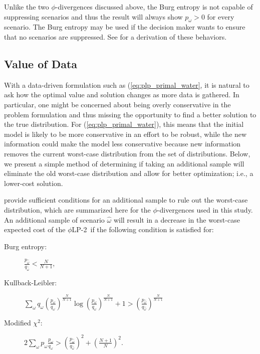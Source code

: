 \documentclass[11pt]{article}
\theoremstyle{plain}
\theoremstyle{definition}
\theoremstyle{remark}
\newcommand{\plp}{$\phi$LP-2}
\begin{document}
Unlike the two $\phi$-divergences discussed above, the Burg entropy is not capable of suppressing scenarios and thus the result will always show $p_\omega > 0$ for every scenario.
The Burg entropy may be used if the decision maker wants to ensure that no scenarios are suppressed.
See \citep{love2013phi} for a derivation of these behaviors.


\subsection{Value of Data}
\label{ssec:value_water}

With a data-driven formulation such as (\ref{eq:plp_primal_water}, it is natural to ask how the optimal value and solution changes as more data is gathered.
In particular, one might be concerned about being overly conservative in the problem formulation and thus missing the opportunity to find a better solution to the true distribution.
For (\ref{eq:plp_primal_water}), this means that the initial model is likely to be more conservative in an effort to be robust, while the new information could make the model less conservative because new information removes the current worst-case distribution from the set of distributions.  
Below, we present a simple method of determining if taking an additional sample will eliminate the old worst-case distribution and allow for better optimization; i.e., a lower-cost solution.

\citet[Theorem 1 and Corollary 1]{love2013phi} provide sufficient conditions for an additional sample to rule out the worst-case distribution, which are summarized here for the $\phi$-divergences used in this study.
An additional sample of scenario $\hat{\omega}$ will result in a decrease in the worst-case expected cost of the \plp\ if the following condition is satisfied for:
	\begin{description}
		\item[Burg entropy:] $\frac{p_{\hat{\omega}}}{q_{\hat{\omega}}} < \frac{N}{N+1}$,
		\item[Kullback-Leibler:] $\sum_\omega q_\omega \left(\frac{p_\omega}{q_\omega}\right)^\frac{N}{N+1} \log\left(\frac{p_\omega}{q_\omega}\right)^\frac{N}{N+1} + 1 > \left(\frac{p_{\hat{\omega}}}{q_{\hat{\omega}}}\right)^\frac{N}{N+1}$
		\item[Modified $\chi^2$:] $2 \sum_\omega p_\omega \frac{p_\omega}{q_\omega} > \left(\frac{p_{\hat{\omega}}}{q_{\hat{\omega}}}\right)^2 + \left(\frac{N+1}{N}\right)^2$.
	\end{description}
\end{document}
